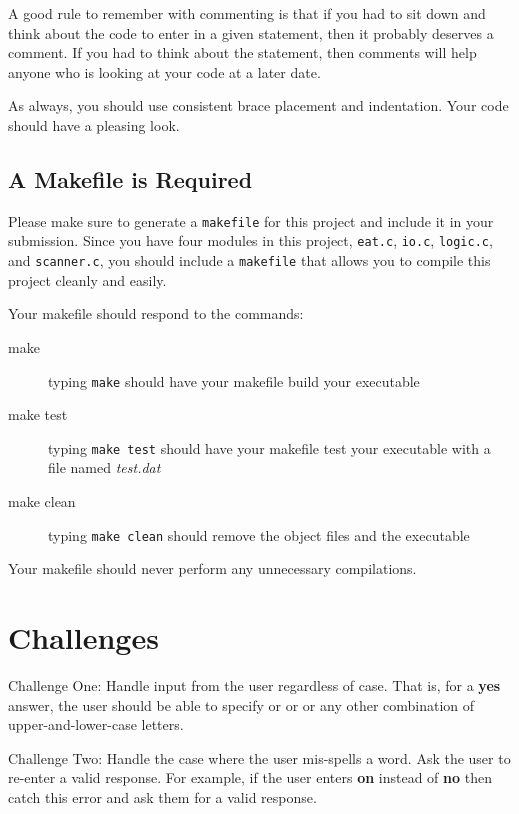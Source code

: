 \documentclass[12pt]{article}
\begin{document}
A good rule to remember with commenting is that if you had to sit down and think
about the code to enter in a given statement, then it probably deserves a comment.
If you had to think about the statement, then comments will help anyone who
is looking at your code at a later date.

As always, you should use consistent brace placement and indentation.
Your code should have a pleasing look.

\subsection*{A Makefile is Required}

Please make sure to generate a {\tt makefile} for this project and include it in your
submission.  Since you have four modules in this project,
{\tt eat.c}, {\tt io.c}, {\tt logic.c},  and {\tt scanner.c},
you should include a {\tt makefile} that
allows you to compile this project cleanly and easily.

Your makefile should respond to the commands:

\begin{description}
\item[make] typing \verb!make! should have your makefile build your executable
\item[make test] typing \verb!make test! should have your makefile test your
executable with a file named {\it test.dat}
\item[make clean] typing \verb!make clean! should remove the object files and the executable
\end{description}

Your makefile should never perform any unnecessary compilations.

\section*{Challenges}

Challenge One: Handle input from the user regardless of case.  That is,
for a {\bf yes} answer, the user should be able to specify
{\color{blue}{\it Yes}} or {\color{blue}{\it yes}}
or {\color{blue}{\it YES}} or any other combination of upper-and-lower-case letters.

Challenge Two: Handle the case where the user mis-spells a word.  Ask the user to re-enter
a valid response.  For example, if the user enters {\bf on} instead of {\bf no} then 
catch this error and ask them for a valid response.
\end{document}
